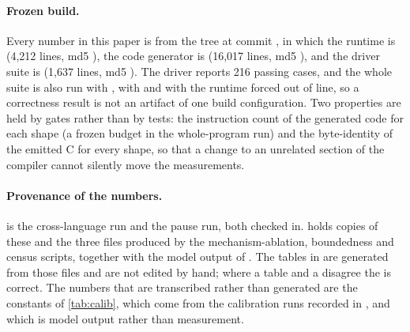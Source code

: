 \paragraph{Frozen build.}
Every number in this paper is from the tree at commit , in which the runtime is
 (4,212 lines, md5 ), the code generator is
 (16,017 lines, md5 ), and the driver suite is
 (1,637 lines, md5 ).  The driver reports 216 passing
cases, and the whole suite is also run with , with
 and with the runtime forced out of line, so a correctness result is not
an artifact of one build configuration.  Two properties are held by gates rather than by tests: the
instruction count of the generated code for each shape (a frozen budget in the whole-program run)
and the byte-identity of the emitted C for every shape, so that a change to an unrelated section of
the compiler cannot silently move the measurements.

\paragraph{Provenance of the numbers.}
 is the cross-language run and  the
pause run, both checked in.   holds copies of these and the three files produced
by the mechanism-ablation, boundedness and census scripts, together with the model output of
.  The tables in  are generated from those files and are
not edited by hand; where a table and a  disagree the  is correct.  The
numbers that are transcribed rather than generated are the constants of
\tab\ref{tab:calib}, which come from the calibration runs recorded in , and
 which is model output rather than measurement.
